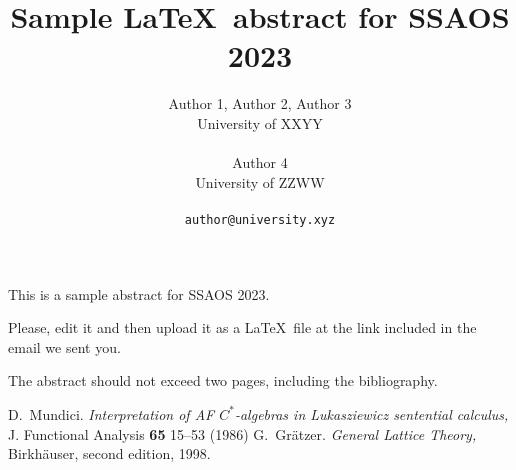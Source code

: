 \documentclass[a4paper]{article} %
\date{} %
\begin{document}
\setcounter{page}{1} %

\title{Sample \LaTeX\ abstract for SSAOS 2023}

\author{Author 1, Author 2, Author 3 \\ %
       University of XXYY\\ \\ %
       Author 4 \\ %
       University of ZZWW\\ \\ %
       \texttt{author@university.xyz} %
       }%

\maketitle


This is a sample abstract for SSAOS 2023.

Please, edit it and then upload it as a \LaTeX~file at the link included in the
email we sent you.

The abstract should not exceed two pages, including the bibliography.

\begin{thebibliography}{99}
D.~Mundici.
\newblock \emph{Interpretation of {A}{F} ${C}^*$-algebras in {L}ukasziewicz sentential calculus,}
\newblock J. Functional Analysis \textbf{65} 15--53 (1986)
G.~Gr{\" a}tzer.
\newblock \emph{General Lattice Theory,}
\newblock Birkh{\" a}user, second edition, 1998.

\end{thebibliography}
\end{document}
